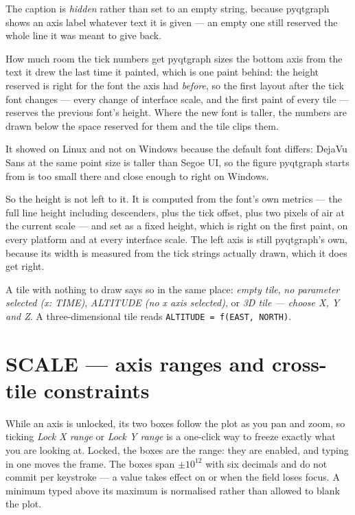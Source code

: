 \documentclass[11pt,a4paper,oneside]{report}
\newcommand{\code}[1]{\texttt{#1}}
\newcommand{\key}[1]{\textsf{\small\fbox{#1}}}
\begin{document}
The caption is \emph{hidden} rather than set to an empty string, because
pyqtgraph shows an axis label whatever text it is given --- an empty one still
reserved the whole line it was meant to give back.

\begin{aoenote}{How much room the tick numbers get}
pyqtgraph sizes the bottom axis from the text it drew the last time it painted,
which is one paint behind: the height reserved is right for the font the axis
had \emph{before}, so the first layout after the tick font changes --- every
change of interface scale, and the first paint of every tile --- reserves the
previous font's height. Where the new font is taller, the numbers are drawn
below the space reserved for them and the tile clips them.

It showed on Linux and not on Windows because the default font differs: DejaVu
Sans at the same point size is taller than Segoe UI, so the figure pyqtgraph
starts from is too small there and close enough to right on Windows.

So the height is not left to it. It is computed from the font's own metrics ---
the full line height including descenders, plus the tick offset, plus two
pixels of air at the current scale --- and set as a fixed height, which is right
on the first paint, on every platform and at every interface scale. The left
axis is still pyqtgraph's own, because its width is measured from the tick
strings actually drawn, which it does get right.
\end{aoenote}

A tile with nothing to draw says so in the same place: \emph{empty tile},
\emph{no parameter selected (x: TIME)}, \emph{ALTITUDE (no x axis selected)}, or
\emph{3D tile --- choose X, Y and Z}. A three-dimensional tile reads
\code{ALTITUDE = f(EAST, NORTH)}.

\section{SCALE --- axis ranges and cross-tile constraints}

While an axis is unlocked, its two boxes follow the plot as you pan and zoom, so
ticking \emph{Lock X range} or \emph{Lock Y range} is a one-click way to freeze
exactly what you are looking at. Locked, the boxes are the range: they are
enabled, and typing in one moves the frame. The boxes span $\pm 10^{12}$ with six
decimals and do not commit per keystroke --- a value takes effect on
\key{Enter} or when the field loses focus. A minimum typed above its maximum is
normalised rather than allowed to blank the plot.
\end{document}
